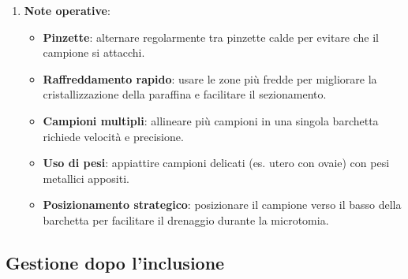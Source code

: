 \begin{enumerate}
\begin{enumerate}
  \end{enumerate}
  \item \textbf{Note operative}:
  \begin{itemize}
    \item \textbf{Pinzette}: alternare regolarmente tra pinzette calde per evitare che il campione si attacchi.
    \item \textbf{Raffreddamento rapido}: usare le zone più fredde per migliorare la cristallizzazione della paraffina e facilitare il sezionamento.
    \item \textbf{Campioni multipli}: allineare più campioni in una singola barchetta richiede velocità e precisione.
    


    \item \textbf{Uso di pesi}: appiattire campioni delicati (es. utero con ovaie) con pesi metallici appositi.
    \item \textbf{Posizionamento strategico}: posizionare il campione verso il basso della barchetta per facilitare il drenaggio durante la microtomia.
  \end{itemize}
\end{enumerate}
\subsection{Gestione dopo l'inclusione}

